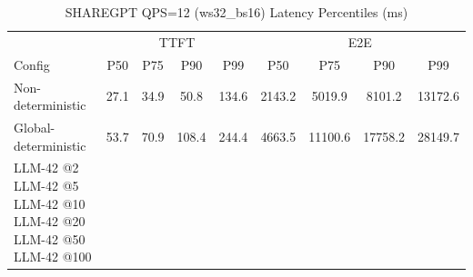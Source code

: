 \begin{table}[htbp]
\centering
\caption{SHAREGPT QPS=12 (ws32_bs16) Latency Percentiles (ms)}
\label{tab:sharegpt_qps12_ws32_bs16}
\begin{tabular}{l|cccc|cccc}
\toprule
& \multicolumn{4}{c|}{TTFT} & \multicolumn{4}{c}{E2E} \\
Config & P50 & P75 & P90 & P99 & P50 & P75 & P90 & P99 \\
\midrule
Non-deterministic & 27.1 & 34.9 & 50.8 & 134.6 & 2143.2 & 5019.9 & 8101.2 & 13172.6 \\
Global-deterministic & 53.7 & 70.9 & 108.4 & 244.4 & 4663.5 & 11100.6 & 17758.2 & 28149.7 \\
LLM-42 @2%
LLM-42 @5%
LLM-42 @10%
LLM-42 @20%
LLM-42 @50%
LLM-42 @100%
\bottomrule
\end{tabular}
\end{table}
